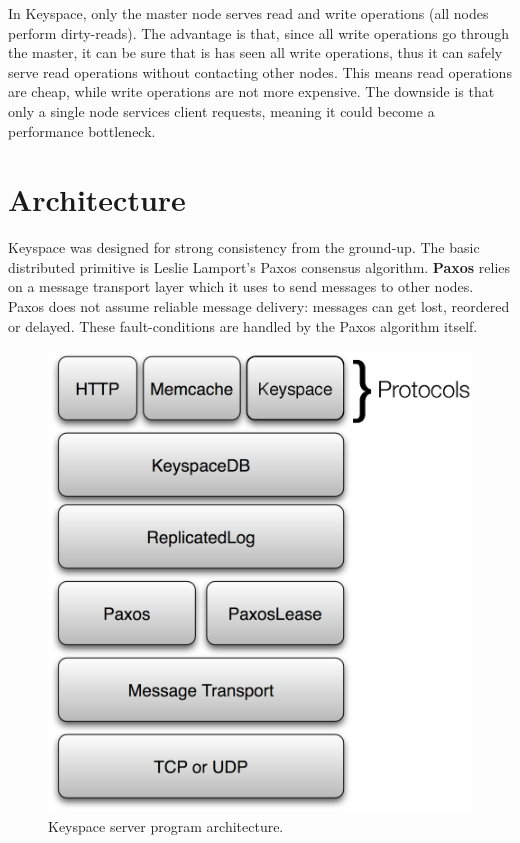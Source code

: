 \documentclass[12pt]{article}
\begin{document}
In Keyspace, only the master node serves read and write operations (all nodes perform dirty-reads). The advantage is that, since all write operations go through the master, it can be sure that is has seen all write operations, thus it can safely serve read operations without contacting other nodes. This means read operations are cheap, while write operations are not more expensive. The downside is that only a single node services client requests, meaning it could become a performance bottleneck.

\section{ Architecture }

Keyspace was designed for strong consistency from the ground-up. The basic distributed primitive is Leslie Lamport's Paxos consensus algorithm. \textbf{Paxos} relies on a message transport layer which it uses to send messages to other nodes. Paxos does not assume reliable message delivery: messages can get lost, reordered or delayed. These fault-conditions are handled by the Paxos algorithm itself.

\begin{figure}[htbp]
\begin{center}
\includegraphics[scale=0.5]{arch1.eps}
\caption{Keyspace server program architecture.}
\end{center}
\end{figure}
\end{document}
